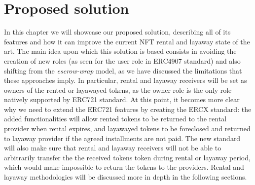 \documentclass[english, LaM, oneside]{sapthesis}%
\begin{document}
\chapter{Proposed solution}
\label{chap:2}
In this chapter we will showcase our proposed solution, describing all of its features and how it can improve the current NFT rental and layaway state of the art. \newline
The main idea upon which this solution is based consists in avoiding the creation of new roles (as seen for the user role in ERC4907 standard) and also shifting from the \textit{escrow-wrap} model, as we have discussed the limitations that these approaches imply. \newline
In particular, rental and layaway receivers will be set as owners of the rented or layawayed tokens, as the owner role is the only role natively supported by ERC721 standard. At this point, it becomes more clear why we need to extend the ERC721 features by creating the ERCX standard: the added functionalities will allow rented tokens to be returned to the rental provider when rental expires, and layawayed tokens to be foreclosed and returned to layaway provider if the agreed installments are not paid. The new standard will also make sure that rental and layaway receivers will not be able to arbitrarily transfer the the received tokens token during rental or layaway period, which would make impossible to return the tokens to the providers. \newline
Rental and layaway methodologies will be discussed more in depth in the following sections.
\end{document}
